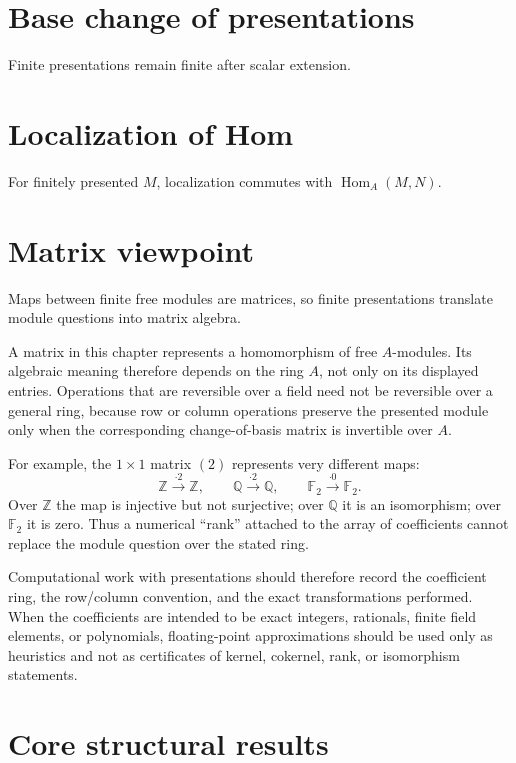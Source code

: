 \section{Base change of presentations}
Finite presentations remain finite after scalar extension.

\section{Localization of Hom}
For finitely presented $M$, localization commutes with $\operatorname{Hom}_A(M,N)$.

\section{Matrix viewpoint}
Maps between finite free modules are matrices, so finite presentations translate module questions into matrix algebra.

\begin{remark}
A matrix in this chapter represents a homomorphism of free \(A\)-modules.
Its algebraic meaning therefore depends on the ring \(A\), not only on its
displayed entries.  Operations that are reversible over a field need not be
reversible over a general ring, because row or column operations preserve the
presented module only when the corresponding change-of-basis matrix is
invertible over \(A\).

For example, the \(1\times1\) matrix \((2)\) represents very different maps:
\[
\mathbb Z\xrightarrow{\cdot2}\mathbb Z,
\qquad
\mathbb Q\xrightarrow{\cdot2}\mathbb Q,
\qquad
\mathbb F_2\xrightarrow{\cdot0}\mathbb F_2.
\]
Over \(\mathbb Z\) the map is injective but not surjective; over \(\mathbb Q\)
it is an isomorphism; over \(\mathbb F_2\) it is zero.  Thus a numerical
``rank'' attached to the array of coefficients cannot replace the module
question over the stated ring.

Computational work with presentations should therefore record the coefficient
ring, the row/column convention, and the exact transformations performed.
When the coefficients are intended to be exact integers, rationals, finite
field elements, or polynomials, floating-point approximations should be used
only as heuristics and not as certificates of kernel, cokernel, rank, or
isomorphism statements.
\end{remark}

\section{Core structural results}

